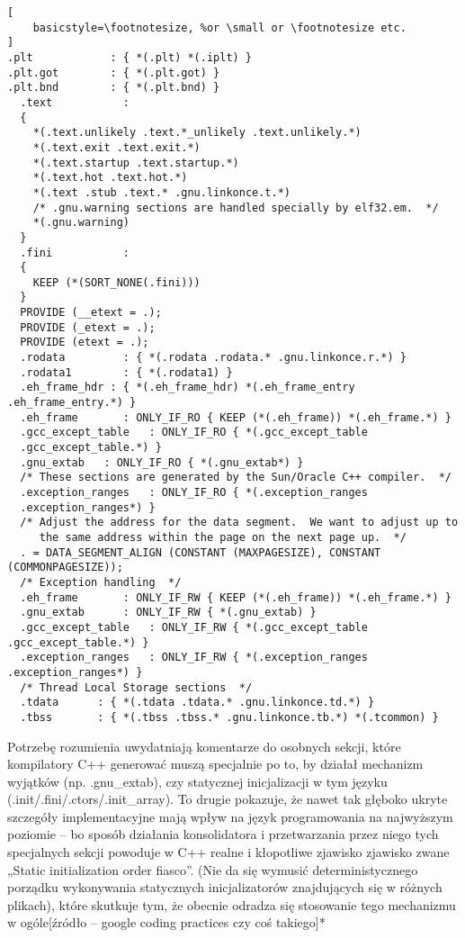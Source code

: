 \begin{lstlisting}[
    basicstyle=\footnotesize, %or \small or \footnotesize etc.
]
.plt            : { *(.plt) *(.iplt) }
.plt.got        : { *(.plt.got) }
.plt.bnd        : { *(.plt.bnd) }
  .text           :
  {
    *(.text.unlikely .text.*_unlikely .text.unlikely.*)
    *(.text.exit .text.exit.*)
    *(.text.startup .text.startup.*)
    *(.text.hot .text.hot.*)
    *(.text .stub .text.* .gnu.linkonce.t.*)
    /* .gnu.warning sections are handled specially by elf32.em.  */
    *(.gnu.warning)
  }
  .fini           :
  {
    KEEP (*(SORT_NONE(.fini)))
  }
  PROVIDE (__etext = .);
  PROVIDE (_etext = .);
  PROVIDE (etext = .);
  .rodata         : { *(.rodata .rodata.* .gnu.linkonce.r.*) }
  .rodata1        : { *(.rodata1) }
  .eh_frame_hdr : { *(.eh_frame_hdr) *(.eh_frame_entry .eh_frame_entry.*) }
  .eh_frame       : ONLY_IF_RO { KEEP (*(.eh_frame)) *(.eh_frame.*) }
  .gcc_except_table   : ONLY_IF_RO { *(.gcc_except_table
  .gcc_except_table.*) }
  .gnu_extab   : ONLY_IF_RO { *(.gnu_extab*) }
  /* These sections are generated by the Sun/Oracle C++ compiler.  */
  .exception_ranges   : ONLY_IF_RO { *(.exception_ranges
  .exception_ranges*) }
  /* Adjust the address for the data segment.  We want to adjust up to
     the same address within the page on the next page up.  */
  . = DATA_SEGMENT_ALIGN (CONSTANT (MAXPAGESIZE), CONSTANT (COMMONPAGESIZE));
  /* Exception handling  */
  .eh_frame       : ONLY_IF_RW { KEEP (*(.eh_frame)) *(.eh_frame.*) }
  .gnu_extab      : ONLY_IF_RW { *(.gnu_extab) }
  .gcc_except_table   : ONLY_IF_RW { *(.gcc_except_table .gcc_except_table.*) }
  .exception_ranges   : ONLY_IF_RW { *(.exception_ranges .exception_ranges*) }
  /* Thread Local Storage sections  */
  .tdata	  : { *(.tdata .tdata.* .gnu.linkonce.td.*) }
  .tbss		  : { *(.tbss .tbss.* .gnu.linkonce.tb.*) *(.tcommon) }
\end{lstlisting}

Potrzebę rozumienia uwydatniają komentarze do osobnych sekcji, które kompilatory C++ generować muszą specjalnie po to, by działał mechanizm wyjątków (np. .gnu\_extab), czy statycznej inicjalizacji w tym języku (.init/.fini/.ctors/.init\_array). To drugie pokazuje, że nawet tak głęboko ukryte szczegóły implementacyjne mają wpływ na język programowania na najwyższym poziomie – bo sposób działania konsolidatora i przetwarzania przez niego tych specjalnych sekcji powoduje w C++ realne i kłopotliwe zjawisko zjawisko zwane „Static initialization order fiasco”. (Nie da się wymusić deterministycznego porządku wykonywania statycznych inicjalizatorów znajdujących się w różnych plikach), które skutkuje tym, że obecnie odradza się stosowanie tego mechanizmu w ogóle[źródło – google coding practices czy coś takiego]*

